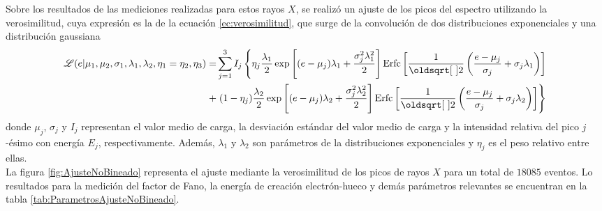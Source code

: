 Sobre los resultados de las mediciones realizadas para estos rayos $X$, se realizó un ajuste de los picos del espectro utilizando la verosimilitud, cuya expresión es la de la ecuación \eqref{ec:verosimilitud}, que surge de la convolución de dos distribuciones exponenciales y una distribución gaussiana
{\small
\begin{align}
    \Lagr(e|\mu_{1},
            \mu_{2},
            \sigma_{1},
            \lambda_{1},
            \lambda_{2},
            \eta_{1} = \eta_{2},
            \eta_{3})
    = &
    \sum\limits_{j=1}^{3} I_{j}
    \left\{
        \eta_{j}\frac{\lambda_{1}}{2}
        \exp
            \left[
                (e-\mu_{j})\lambda_{1} + \frac{\sigma_{j}^{2}\lambda_{1}^{2}}{2}
            \right]
        \mbox{Erfc}
        \left[
            \frac{1}{\sqrt{2}}
            \left(
                \frac{e - \mu_{j}}{\sigma_{j}}
                +\sigma_{j}\lambda_{1}
            \right)
        \right] \right. \nonumber
        \\
        + &
        \left.
        (1-\eta_{j})\frac{\lambda_{2}}{2}
        \exp
            \left[
                 (e - \mu_{j})\lambda_{2}
                 + \frac{\sigma_{j}^{2}\lambda_{2}^{2}}{2}
            \right]
        \mbox{Erfc}
        \left[
            \frac{1}{\sqrt{2}}
            \left(
                \frac{e - \mu_{j}}{\sigma_{j}}
                +\sigma_{j}\lambda_{2}
            \right)
        \right]
    \right\}
        \label{ec:verosimilitud}
\end{align}
}
donde $\mu_{j}$, $\sigma_{j}$ y $I_{j}$ representan el valor medio de carga, la desviación estándar del valor medio de carga y la intensidad relativa del pico $j$-ésimo con energía $E_{j}$, respectivamente. Además, $\lambda_{1}$ y $\lambda_{2}$ son parámetros de la distribuciones exponenciales y $\eta_{j}$ es el peso relativo entre ellas.\\
\indent La figura \ref{fig:AjusteNoBineado} representa el ajuste mediante la verosimilitud de los picos de rayos $X$ para un total de $18085$ eventos. Lo resultados para la medición del factor de Fano, la energía de creación electrón-hueco y demás parámetros relevantes se encuentran en la tabla \ref{tab:ParametrosAjusteNoBineado}.
